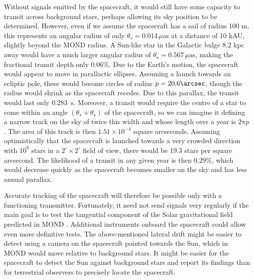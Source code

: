 \documentclass[fleqn,usenatbib,useAMS]{mnras} %
\begin{document}
Without signals emitted by the spacecraft, it would still have some capacity to transit across background stars, perhaps allowing its sky position to be determined. However, even if we assume the spacecraft has a sail of radius 100 m, this represents an angular radius of only $\theta_s = 0.014 \, \mu$as at a distance of 10 kAU, slightly beyond the MOND radius. A Sun-like star in the Galactic bulge 8.2 kpc away \citep{Gravity_2019} would have a much larger angular radius of $\theta_{\star} = 0.567 \, \mu$as, making the fractional transit depth only 0.06\%. Due to the Earth's motion, the spacecraft would appear to move in parallactic ellipses. Assuming a launch towards an ecliptic pole, these would become circles of radius $p = 20.6\arcsec$, though the radius would shrink as the spacecraft recedes. Due to this parallax, the transit would last only 0.283~s. Moreover, a transit would require the centre of a star to come within an angle $\left( \theta_s + \theta_{\star} \right)$ of the spacecraft, so we can imagine it defining a narrow track on the sky of twice this width and whose length over a year is $2 \mathrm{\pi}p$. The area of this track is then $1.51 \times 10^{-4}$ square arcseconds. Assuming optimistically that the spacecraft is launched towards a very crowded direction with $10^9$ stars in a $2^\circ \times 2^\circ$ field of view, there would be 19.3 stars per square arcsecond. The likelihood of a transit in any given year is then 0.29\%, which would decrease quickly as the spacecraft becomes smaller on the sky and has less annual parallax.

Accurate tracking of the spacecraft will therefore be possible only with a functioning transmitter. Fortunately, it need not send signals very regularly if the main goal is to test the tangential component of the Solar gravitational field predicted in MOND \citep{Banik_2019_spacecraft}. Additional instruments onboard the spacecraft could allow even more definitive tests. The above-mentioned lateral drift might be easier to detect using a camera on the spacecraft pointed towards the Sun, which in MOND would move relative to background stars. It might be easier for the spacecraft to detect the Sun against background stars and report its findings than for terrestrial observers to precisely locate the spacecraft.
\end{document}
